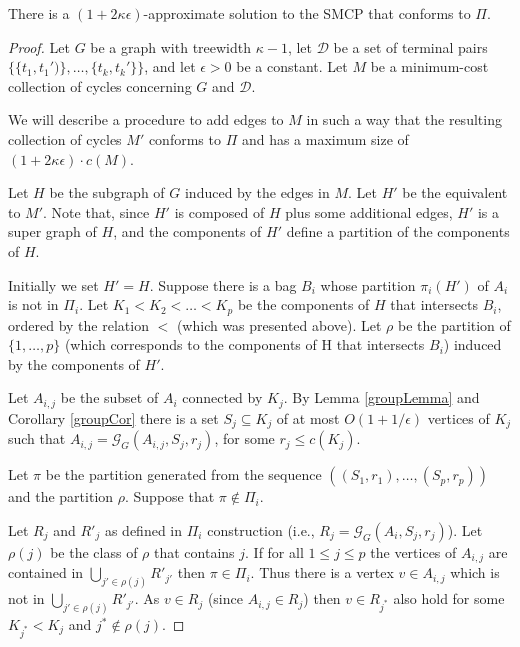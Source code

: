 \begin{theorem}\label{conformingPi}

There is a \((1 + 2 \kappa \epsilon)\)-approximate solution to the SMCP that conforms to \(\Pi\).

\end{theorem}
\begin{proof}

Let \(G\) be a graph with treewidth \(\kappa - 1\), let \(\mathcal{D}\) be a set of terminal pairs \(\{\{t_1, t_1')\}, \dots, \{t_k, t_k'\}\}\), and  let \(\epsilon > 0\) be a constant.
Let \(M\) be a minimum-cost collection of cycles concerning \(G\) and \(\mathcal{D}\).

We will describe a procedure to add edges to \(M\) in such a way that the resulting collection of cycles \(M'\) conforms to \(\Pi\) and has a maximum size of \((1 + 2\kappa \epsilon ) \cdot c(M)\).

Let \(H\) be the subgraph of \(G\) induced by the edges in \(M\). Let \(H'\) be the equivalent to \(M'\). Note that, since \(H'\) is composed of \(H\) plus some additional edges, \(H'\) is a super graph of \(H\), and the components of \(H'\) define a partition of the components of \(H\).

Initially we set \(H' = H\). Suppose there is a bag \(B_i\) whose partition \(\pi_i(H')\) of \(A_i\) is not in \(\Pi_i\). Let \(K_1 < K_2 < \dots < K_p\) be the components of \(H\) that intersects \(B_i\), ordered by the relation \(<\) (which was presented above). Let \(\rho\) be the partition of \(\{1, \dots, p\}\) (which corresponds to the components of H that intersects \(B_i\)) induced by the components of \(H'\).

Let \(A_{i, j}\) be the subset of \(A_i\) connected by \(K_j\). By Lemma \ref{groupLemma} and Corollary \ref{groupCor} there is a set \(S_j \subseteq K_j\) of at most \(O(1 + 1/\epsilon)\) vertices of \(K_j\) such that \(A_{i,j} = \mathcal{G}_G(A_{i,j}, S_j, r_j)\), for some \(r_j \leq c(K_j)\).

Let \(\pi\) be the partition generated from the sequence \(((S_1, r_1), \dots, (S_p, r_p))\) and the partition \(\rho\).  
Suppose that \(\pi \notin \Pi_i\).

Let \(R_j\) and \(R'_j\) as defined in \(\Pi_i\) construction (i.e., \(R_j = \mathcal{G}_G(A_i, S_j, r_j)\)). Let \(\rho(j)\) be the class of \(\rho\) that contains \(j\). If for all \(1 \leq j \leq p\)  the vertices of \(A_{i,j}\) are contained in \(\bigcup_{j' \in \rho(j)}R'_{j'}\) then \(\pi \in \Pi_i\).
Thus there is a vertex \(v \in A_{i,j}\) which is not in \(\bigcup_{j' \in \rho(j)}R'_{j'}\). As \(v \in R_j\) (since \(A_{i,j} \in R_j\)) then \(v \in R_{j^\ast}\) also hold for some \(K_{j^\ast} < K_j\) and \(j^\ast \not\in \rho(j)\).


\end{proof}
